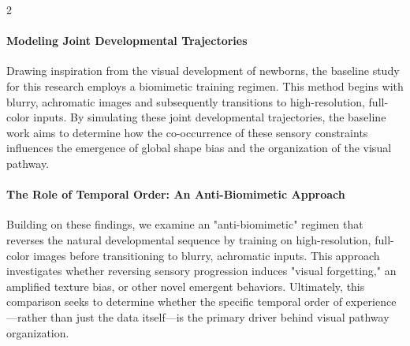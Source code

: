\begin{multicols}{2}
\paragraph{Modeling Joint Developmental Trajectories}
Drawing inspiration from the visual development of newborns, the baseline study for this research\cite{vogelsang2024a} employs a biomimetic training regimen. This method begins with blurry, achromatic images and subsequently transitions to high-resolution, full-color inputs. By simulating these joint developmental trajectories, the baseline work aims to determine how the co-occurrence of these sensory constraints influences the emergence of global shape bias and the organization of the visual pathway.

\paragraph{The Role of Temporal Order: An Anti-Biomimetic Approach}
Building on these findings, we examine an "anti-biomimetic" regimen that reverses the natural developmental sequence by training on high-resolution, full-color images before transitioning to blurry, achromatic inputs. This approach investigates whether reversing sensory progression induces "visual forgetting," an amplified texture bias, or other novel emergent behaviors. Ultimately, this comparison seeks to determine whether the specific temporal order of experience—rather than just the data itself—is the primary driver behind visual pathway organization.


\end{multicols}